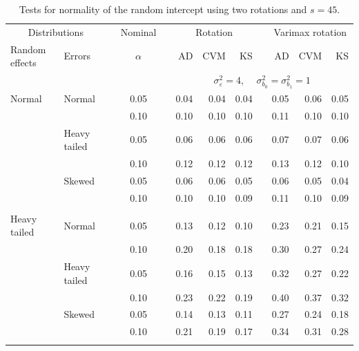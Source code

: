 \documentclass[12pt]{article} %
\begin{document}
\begin{table}[ht]
\caption{Tests for normality of the random intercept using two rotations and $s = 45$.}
\begin{scriptsize}
\begin{center}
\begin{tabular}{ll p{.1cm} c p{.1cm} rrr p{.1cm} rrr}
  \hline
  \multicolumn{2}{c}{Distributions}& & Nominal & &  \multicolumn{3}{c}{Rotation} & & \multicolumn{3}{c}{Varimax rotation} \\ \cline{1-2} \cline{6-8} \cline{10-12}   
  Random effects & Errors & & $\alpha$ & & AD & CVM & KS & & AD & CVM & KS \\ 
   \hline
& && && \multicolumn{7}{c}{$\sigma_{\varepsilon}^2 = 4$, \ \ $\sigma_{b_0}^2 = \sigma_{b_1}^2 = 1$} \\ \cline{6-12}
\rowcolor{gray!20}Normal       & Normal       && 0.05 &&   0.04 & 0.04 & 0.04 && 0.05 & 0.06 & 0.05 \\ 
\rowcolor{gray!20}             &              && 0.10 &&   0.10 & 0.10 & 0.10 && 0.11 & 0.10 & 0.10 \\ 
\rowcolor{gray!20}             & Heavy tailed && 0.05 &&   0.06 & 0.06 & 0.06 && 0.07 & 0.07 & 0.06 \\ 
\rowcolor{gray!20}             &              && 0.10 &&   0.12 & 0.12 & 0.12 && 0.13 & 0.12 & 0.10 \\ 
\rowcolor{gray!20}             & Skewed       && 0.05 &&   0.06 & 0.06 & 0.05 && 0.06 & 0.05 & 0.04 \\ 
\rowcolor{gray!20}             &              && 0.10 &&   0.10 & 0.10 & 0.09 && 0.11 & 0.10 & 0.09 \\ 
             &&&&&&&&&&&\\
Heavy tailed & Normal       && 0.05 &&   0.13 & 0.12 & 0.10 && 0.23 & 0.21 & 0.15 \\ 
             &              && 0.10 &&   0.20 & 0.18 & 0.18 && 0.30 & 0.27 & 0.24 \\ 
             & Heavy tailed && 0.05 &&   0.16 & 0.15 & 0.13 && 0.32 & 0.27 & 0.22 \\ 
             &              && 0.10 &&   0.23 & 0.22 & 0.19 && 0.40 & 0.37 & 0.32 \\ 
             & Skewed       && 0.05 &&   0.14 & 0.13 & 0.11 && 0.27 & 0.24 & 0.18 \\ 
             &              && 0.10 &&   0.21 & 0.19 & 0.17 && 0.34 & 0.31 & 0.28 \\ 
             &&&&&&&&&&&\\

\end{tabular}
\end{center}
\end{scriptsize}
\end{table}
\end{document}
